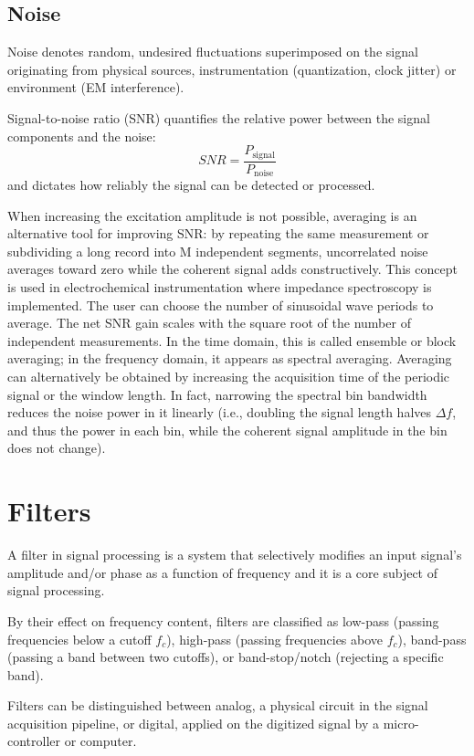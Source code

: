 \subsection{Noise}

Noise denotes random, undesired fluctuations superimposed on the signal originating from physical sources, instrumentation (quantization, clock jitter) or environment (EM interference). 

Signal-to-noise ratio (SNR) quantifies the relative power between the signal components and the noise:
$$
SNR = \frac{P_{\mathrm{signal}}}{P_{\mathrm{noise}}}
$$
and dictates how reliably the signal can be detected or processed. 

When increasing the excitation amplitude is not possible, averaging is an alternative tool for improving SNR: by repeating the same measurement or subdividing a long record into M independent segments, uncorrelated noise averages toward zero while the coherent signal adds constructively.
This concept is used in electrochemical instrumentation where impedance spectroscopy is implemented.
The user can choose the number of sinusoidal wave periods to average.
The net SNR gain scales with the square root of the number of independent measurements.
In the time domain, this is called ensemble or block averaging; in the frequency domain, it appears as spectral averaging.
Averaging can alternatively be obtained by increasing the acquisition time of the periodic signal or the window length.
In fact, narrowing the spectral bin bandwidth reduces the noise power in it linearly (i.e., doubling the signal length halves $\Delta f$, and thus the power in each bin, while the coherent signal amplitude in the bin does not change).

\section{Filters}

A filter in signal processing is a system that selectively modifies an input signal's amplitude and/or phase as a function of frequency and it is a core subject of signal processing.

By their effect on frequency content, filters are classified as low-pass (passing frequencies below a cutoff $f_c$), high-pass (passing frequencies above $f_c$), band-pass (passing a band between two cutoffs), or band-stop/notch (rejecting a specific band).  
  
Filters can be distinguished between analog, a physical circuit in the signal acquisition pipeline, or digital, applied on the digitized signal by a micro-controller or computer.

